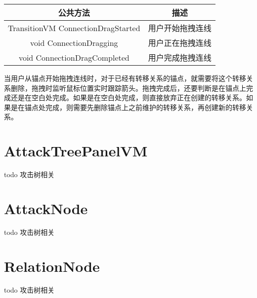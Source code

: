 \par
\begin{table}[h]
	\centering
	\begin{tabular}{|c|c|}
		\hline
		\textbf{公共方法}                      & \textbf{描述} \\ \hline
		TransitionVM ConnectionDragStarted & 用户开始拖拽连线    \\ \hline
		void ConnectionDragging            & 用户正在拖拽连线    \\ \hline
		void ConnectionDragCompleted       & 用户完成拖拽连线    \\ \hline
	\end{tabular}
\end{table}
\par
当用户从锚点开始拖拽连线时，对于已经有转移关系的锚点，就需要将这个转移关系删除，拖拽时监听鼠标位置实时跟踪箭头。拖拽完成后，还要判断是在锚点上完成还是在空白处完成。如果是在空白处完成，则直接放弃正在创建的转移关系。如果是在锚点处完成，则需要先删除锚点上之前维护的转移关系，再创建新的转移关系。

\section{AttackTreePanelVM}
todo 攻击树相关

\section{AttackNode}
todo 攻击树相关

\section{RelationNode}
todo 攻击树相关


